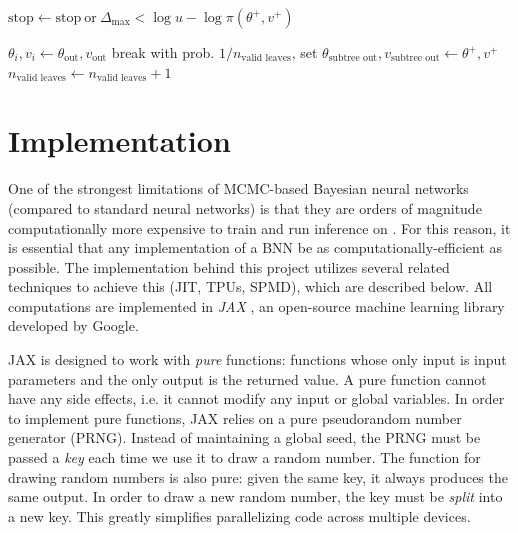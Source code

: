 \documentclass[12pt]{article}
\begin{document}
\begin{algorithm}
\begin{algorithmic}
		\State $\textrm{stop} \gets \textrm{stop} \ \textrm{or} \ \Delta_\mathrm{max} < \log u - \log \pi(\theta^+, v^+)$ 
			
			\State $\theta_i, v_i \gets \theta_\textrm{out}, v_\textrm{out}$ 
			\State break
		\Else
			 
				\State with prob. $1/n_\textrm{valid leaves}$, set $\theta_\textrm{subtree out}, v_\textrm{subtree out} \gets \theta^+, v^+$ 
				\State $n_\textrm{valid leaves} \gets n_\textrm{valid leaves} + 1$
			\EndIf
		\EndIf
		
	\EndFor
\EndFor
\end{algorithmic}
\end{algorithm}
\restoregeometry

\section{Implementation}

One of the strongest limitations of MCMC-based Bayesian neural networks (compared to standard neural networks) is that they are orders of magnitude computationally more expensive to train and run inference on \cite{bnn_posterior}. For this reason, it is essential that any implementation of a BNN be as computationally-efficient as possible. The implementation behind this project utilizes several related techniques to achieve this (JIT, TPUs, SPMD), which are described below. All computations are implemented in \textit{JAX} \cite{jax}, an open-source machine learning library developed by Google.

JAX is designed to work with \textit{pure} functions: functions whose only input is input parameters and the only output is the returned value. A pure function cannot have any side effects, i.e. it cannot modify any input or global variables. In order to implement pure functions, JAX relies on a pure pseudorandom number generator (PRNG). Instead of maintaining a global seed, the PRNG must be passed a \textit{key} each time we use it to draw a random number. The function for drawing random numbers is also pure: given the same key, it always produces the same output. In order to draw a new random number, the key must be \textit{split} into a new key. This greatly simplifies parallelizing code across multiple devices.  
\end{document}

